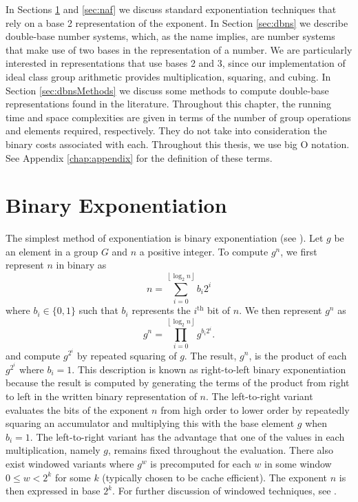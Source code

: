 \documentclass{ucalgthes1}
\theoremstyle{definition}
\newcommand{\floor}[1]{\left\lfloor #1 \right\rfloor}
\begin{document}
In Sections \ref{sec:binaryExp} and \ref{sec:naf} we discuss standard exponentiation techniques that rely on a base 2 representation of the exponent.  In Section \ref{sec:dbns} we describe double-base number systems, which, as the name implies, are number systems that make use of two bases in the representation of a number.  We are particularly interested in representations that use bases 2 and 3, since our implementation of ideal class group arithmetic provides multiplication, squaring, and cubing. In Section \ref{sec:dbnsMethods} we discuss some methods to compute double-base representations found in the literature.  Throughout this chapter, the running time and space complexities are given in terms of the number of group operations and elements required, respectively.  They do not take into consideration the binary costs associated with each.  Throughout this thesis, we use big O notation.  See Appendix \ref{chap:appendix} for the definition of these terms.


\section{Binary Exponentiation}
\label{sec:binaryExp}
The simplest method of exponentiation is binary exponentiation (see \cite[\S 9.1.1]{Cohen2006}).  Let $g$ be an element in a group $G$ and $n$ a positive integer.  To compute $g^n$, we first represent $n$ in binary as
\[
	n = \sum_{i=0}^{\floor{\log_2 n}} b_i 2^i
\]
where $b_i \in \{0, 1\}$ such that $b_i$ represents the $i^{\textrm{th}}$ bit of $n$.  We then represent $g^n$ as
\[
	g^n = \prod_{i=0}^{\floor{\log_2 n}} g^{b_i 2^i}.
\]
and compute $g^{2^i}$ by repeated squaring of $g$.  The result, $g^n$, is the product of each $g^{2^i}$ where $b_i = 1$.  This description is known as right-to-left binary exponentiation because the result is computed by generating the terms of the product from right to left in the written binary representation of $n$.  The left-to-right variant evaluates the bits of the exponent $n$ from high order to lower order by repeatedly squaring an accumulator and multiplying this with the base element $g$ when $b_i = 1$.  The left-to-right variant has the advantage that one of the values in each multiplication, namely $g$, remains fixed throughout the evaluation.  There also exist windowed variants where $g^w$ is precomputed for each $w$ in some window $0 \le w < 2^k$ for some $k$ (typically chosen to be cache efficient). The exponent $n$ is then expressed in base $2^k$.  For further discussion of windowed techniques, see \cite[Subsection~9.1.3.~p.149]{Cohen2006}.
\end{document}

